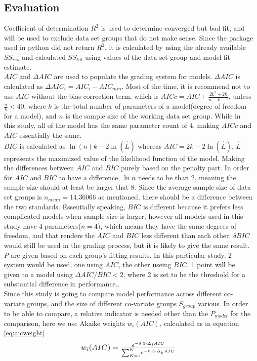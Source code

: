 \documentclass[11pt]{article}
\begin{document}
\subsection{Evaluation}\label{evaluation}
Coefficient of determination $R^2$ is used to determine converged but bad fit, and will be used to exclude data set groups that do not make sense. Since the package used in python did not return $R^2$, it is calculated by using the already available $SS_{res}$ and calculated $SS_{tot}$ using values of the data set group and model fit estimate.\\
$AIC$ and $\Delta AIC$ are used to populate the grading system for models. $\Delta AIC$ is calculated as  $\Delta AIC_{i} = AIC_{i} - AIC_{min}$. Most of the time, it is recommend not to use $AIC$ without the bias correction term, which is $AICc =  AIC + \frac{2k^2+2k}{n-k-1}$, unless $\frac{n}{k} < 40$, where $k$ is the  total number of parameters of a model(degree of freedom for a model), and $n$ is the sample size of the working data set group\parencite{burnham2002practical}. While in this study, all of the model has the same parameter count of 4, making $AICc$ and $AIC$ essentially the same.\\
$BIC$ is calculated as $\ln(n)k - 2\ln(\hat L)$ whereas $AIC = 2k - 2\ln(\hat L)$, $\hat L$ represents the maximized value of the likelihood function of the model. Making the differences between $AIC$ and $BIC$ purely based on the penalty part. In order for $AIC$ and $BIC$ to have a difference, $\ln n$ needs to be than $2$, meaning the sample size should at least be larger that $8$. Since the average sample size of data set groups is $n_{mean} = 14.36066$ as mentioned, there should be a difference between the two standards. Essentially speaking, $BIC$ is different because it prefers less complicated models when sample size is larger, however all models used in this study have 4 parameters($n=4$), which means they have the same degrees of freedom, and that renders the $AIC$ and $BIC$ less different than each other. $\delta BIC$ would still be used in the grading process, but it is likely to give the same result.\\
$P$ are given based on each group's fitting results. In this particular study, 2 system would be used, one using $AIC$, the other useing $BIC$. 1 point will be given to a model using $\Delta AIC/BIC < 2$, where 2 is set to be the threshold for a substantial difference in performance.\parencite{burnham2004multimodel, 10.2307/2291091}. \\
Since this study is going to compare model performance across different co-variate groups, and the size of different co-variate groups $S_{group}$ various. In order to be able to compare, a relative indicator is needed other than the $P_{model}$ for the comparison, here we use Akaike weights $w_{i}(AIC)$\parencite{wagenmakers2004aic}, calculated as in equation \ref{eq:aicweight}\\
\begin{equation}
\resizebox{.4\hsize}{!}{$w_{i}(AIC)=
\frac
{e^{-0.5\cdot{\Delta}_i AIC}}
{{\sum_{K=1}^K}{e^{-0.5\cdot{\Delta}_k AIC}}}$}\label{eq:aicweight}
\end{equation}
\end{document}
